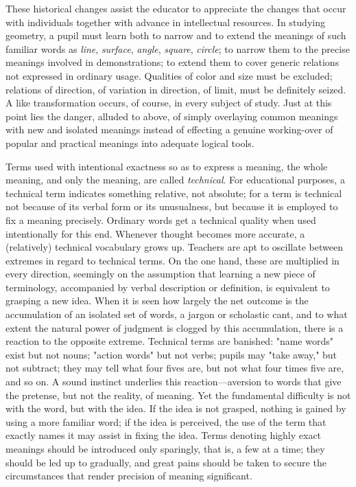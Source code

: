 \documentclass[showtrims,ustradepaper]{memoir}
\begin{document}

These historical changes assist the educator to appreciate the changes
that occur with individuals together with advance in intellectual
resources. In
studying
geometry, a pupil must learn both to narrow and to extend the meanings
of such familiar words as \emph{line}, \emph{surface}, \emph{angle},
\emph{square}, \emph{circle}; to narrow them to the precise meanings
involved in demonstrations; to extend them to cover generic relations
not expressed in ordinary usage. Qualities of color and size must be
excluded; relations of direction, of variation in direction, of limit,
must be definitely seized. A like transformation occurs, of course, in
every subject of study. Just at this point lies the danger, alluded to
above, of simply overlaying common meanings with new and isolated
meanings instead of effecting a genuine working-over of popular and
practical meanings into adequate logical tools.


Terms used with intentional exactness so as to express a meaning, the
whole meaning, and only the meaning, are called \emph{technical}. For
educational purposes, a technical term indicates something relative, not
absolute; for a term is technical not because of its verbal form or its
unusualness, but because it is employed to fix a meaning precisely.
Ordinary words get a technical quality when used intentionally for this
end. Whenever thought becomes more accurate, a (relatively) technical
vocabulary grows up. Teachers are apt to oscillate between extremes in
regard to technical terms. On the one hand, these are multiplied in
every direction, seemingly on the assumption that learning a new piece
of terminology, accompanied by verbal description or definition, is
equivalent to grasping a new idea. When it is seen how largely the net
outcome is the accumulation of an isolated set of words, a jargon or
scholastic cant, and to what extent the natural power of judgment is
clogged by this accumulation, there is a reaction to the opposite
extreme. Technical terms are
banished:
"name words" exist but not nouns; "action words" but not verbs; pupils
may "take away," but not subtract; they may tell what four fives are,
but not what four times five are, and so on. A sound instinct underlies
this reaction---aversion to words that give the pretense, but not the
reality, of meaning. Yet the fundamental difficulty is not with the
word, but with the idea. If the idea is not grasped, nothing is gained
by using a more familiar word; if the idea is perceived, the use of the
term that exactly names it may assist in fixing the idea. Terms denoting
highly exact meanings should be introduced only sparingly, that is, a
few at a time; they should be led up to gradually, and great pains
should be taken to secure the circumstances that render precision of
meaning significant.
\end{document}
